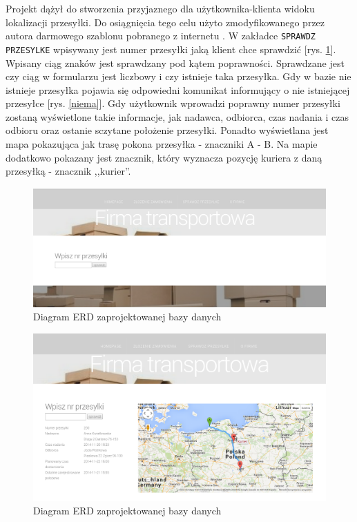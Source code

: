 \documentclass[eng,printmode,oneside]{mgr}
\begin{document}
Projekt dążył do stworzenia przyjaznego dla użytkownika-klienta widoku
lokalizacji przesyłki. Do osiągnięcia tego celu użyto zmodyfikowanego przez
autora darmowego szablonu pobranego z internetu \cite{szablon}. W zakładce
\texttt{SPRAWDZ PRZESYLKE} wpisywany jest numer przesyłki jaką klient chce
sprawdzić [rys.
\ref{sprawdz}]. Wpisany ciąg znaków jest sprawdzany pod kątem poprawności.
Sprawdzane jest czy ciąg w formularzu jest liczbowy i czy istnieje taka
przesyłka. Gdy w bazie nie istnieje przesyłka pojawia się odpowiedni komunikat
informujący o nie istniejącej przesyłce [rys. \ref{niema}]. Gdy użytkownik
wprowadzi poprawny numer przesyłki zostaną wyświetlone takie informacje, jak
nadawca, odbiorca, czas nadania i czas odbioru oraz ostanie sczytane położenie
przesyłki. Ponadto wyświetlana jest mapa pokazująca jak trasę pokona przesyłka -
znaczniki A - B. Na mapie dodatkowo pokazany jest znacznik, który wyznacza
pozycję kuriera z daną przesyłką - znacznik ,,kurier''.

\begin{figure}[ht!]
\centering
\includegraphics[width=90ex]{sprawdz.png}
\caption{Diagram ERD zaprojektowanej bazy danych}
\label{sprawdz}
\end{figure}

\begin{figure}[ht!]
\centering
\includegraphics[width=90ex]{przyklad.png}
\caption{Diagram ERD zaprojektowanej bazy danych}
\label{pokaz}
\end{figure}
\end{document}
